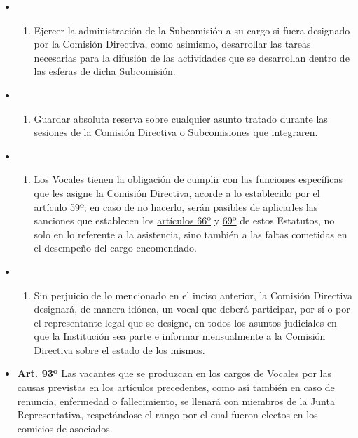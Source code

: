 \documentclass[openany]{book}
\providecommand{\tightlist}{%
  \setlength{\itemsep}{0pt}\setlength{\parskip}{0pt}}
\begin{document}
\begin{itemize}
\begin{itemize}
  \item
    \begin{enumerate}
    \def\labelenumi{\alph{enumi})}
    \setcounter{enumi}{5}
    \tightlist
    \item
      Ejercer la administración de la Subcomisión a su cargo si fuera designado por la Comisión Directiva, como asimismo, desarrollar las tareas necesarias para la difusión de las actividades que se desarrollan dentro de las esferas de dicha Subcomisión.
    \end{enumerate}
  \item
    \begin{enumerate}
    \def\labelenumi{\alph{enumi})}
    \setcounter{enumi}{6}
    \tightlist
    \item
      Guardar absoluta reserva sobre cualquier asunto tratado durante las sesiones de la Comisión Directiva o Subcomisiones que integraren.
    \end{enumerate}
  \item
    \begin{enumerate}
    \def\labelenumi{\alph{enumi})}
    \setcounter{enumi}{7}
    \tightlist
    \item
      Los Vocales tienen la obligación de cumplir con las funciones específicas que les asigne la Comisión Directiva, acorde a lo establecido por el \protect\hyperlink{art59}{artículo 59º}; en caso de no hacerlo, serán pasibles de aplicarles las sanciones que establecen los \protect\hyperlink{art66}{artículos 66º} y \protect\hyperlink{art69}{69º} de estos Estatutos, no solo en lo referente a la asistencia, sino también a las faltas cometidas en el desempeño del cargo encomendado.
    \end{enumerate}
  \item
    \begin{enumerate}
    \def\labelenumi{\roman{enumi})}
    \tightlist
    \item
      Sin perjuicio de lo mencionado en el inciso anterior, la Comisión Directiva designará, de manera idónea, un vocal que deberá participar, por sí o por el representante legal que se designe, en todos los asuntos judiciales en que la Institución sea parte e informar mensualmente a la Comisión Directiva sobre el estado de los mismos.
    \end{enumerate}
  \end{itemize}
\end{itemize}

\begin{itemize}
\tightlist
\item
  \textbf{Art. 93º}
  Las vacantes que se produzcan en los cargos de Vocales por las causas previstas en los artículos precedentes, como así también en caso de renuncia, enfermedad o fallecimiento, se llenará con miembros de la Junta Representativa, respetándose el rango por el cual fueron electos en los comicios de asociados.
\end{itemize}
\end{document}
